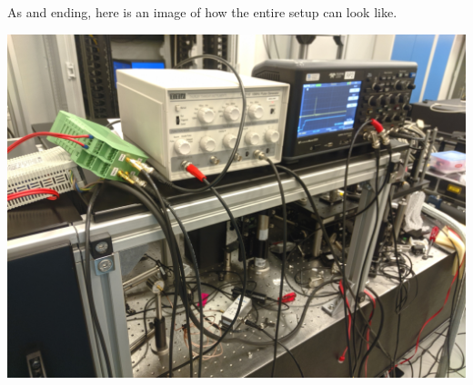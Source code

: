 \documentclass[a4paper, 10pt]{article}
\begin{document}
\newpage

\begin{center}
As and ending, here is an image of how the entire setup can look like.

\vspace{5em}

\includegraphics[width=\textwidth]{../images/whole-setup.jpg}
\end{center}
\end{document}
